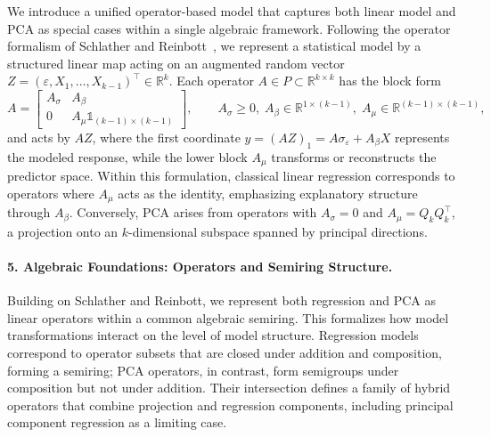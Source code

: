 We introduce a unified operator-based model that captures both linear model and PCA as special cases within a single algebraic framework. Following the operator formalism of Schlather and Reinbott~\cite{reinbott2021}, we represent a statistical model by a structured linear map acting on an augmented random vector $Z = (\varepsilon, X_1, \dots, X_{k-1})^\top \in \mathbb{R}^k$.
Each operator $A \in P \subset \mathbb{R}^{k\times k}$ has the block form
\[
A =
\begin{bmatrix}
A_\sigma & A_\beta \\[4pt]
0 & A_\mu \mathbb{1}_{(k-1)\times(k-1)}
\end{bmatrix},
\qquad
A_\sigma \ge 0,\; A_\beta \in \mathbb{R}^{1\times (k-1)},\; A_\mu \in \mathbb{R}^{(k-1)\times(k-1)},
\]
and acts by $AZ$, where the first coordinate $y = (AZ)_1 = A\sigma_ \varepsilon + A_\beta X$ represents the modeled response, while the lower block $A_\mu$ transforms or reconstructs the predictor space. Within this formulation, classical linear regression corresponds to operators where $A_\mu$ acts as the identity, emphasizing explanatory structure through $A_\beta$.
Conversely, PCA arises from operators with $A_\sigma = 0$ and $A_\mu = Q_k Q_k^\top$, a projection onto an $k$-dimensional subspace spanned by principal directions. 

\paragraph{5. Algebraic Foundations: Operators and Semiring Structure.}

Building on Schlather and Reinbott, we represent both regression and PCA as linear operators within a common algebraic semiring.
This formalizes how model transformations interact on the level of model structure. Regression models correspond to operator subsets that are closed under addition and composition, forming a semiring; PCA operators, in contrast, form semigroups under composition but not under addition. Their intersection defines a family of hybrid operators that combine projection and regression components, including principal component regression as a limiting case.


